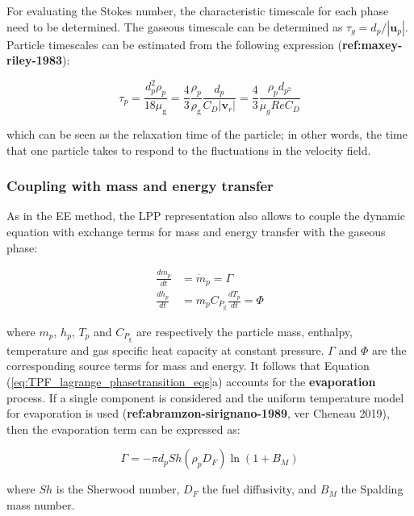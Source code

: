 For evaluating the Stokes number, the characteristic timescale for each phase need to be determined. The gaseous timescale can be determined as $\tau_g = d_p / | \textbf{u}_p |$. Particle timescales can be estimated from the following expression (\textbf{ref:maxey-riley-1983}):

\begin{equation}
\tau_p = \frac{d_p^2 \rho_p}{18 \mu_\mathrm{g}} =  \frac{4}{3} \frac{\rho_p}{\rho_\mathrm{g}} \frac{d_p}{C_D | \boldsymbol{v}_r |} = \frac{4}{3} \frac{\rho_p d_{p^2}}{\mu_g Re C_D}
\end{equation}

which can be seen as the relaxation time of the particle; in other words, the time that one particle takes to respond to the fluctuations in the velocity field.


\subsubsection*{Coupling with mass and energy transfer}

As in the EE method, the LPP representation also allows to couple the dynamic equation with exchange terms for mass and energy transfer with the gaseous phase:

\begin{subequations}
\label{eq:TPF_lagrange_phasetransition_eqs}
\begin{align}
\frac{d m_p}{d t} &= \dot{m}_p = \Gamma \\
\frac{d h_p}{d t} &= m_p C_{P_\mathrm{g}} \frac{d T_p}{d t} = \Phi
\end{align}
\end{subequations}

where $m_p$, $h_p$, $T_p$ and $C_{P_\mathrm{g}}$ are respectively the particle mass, enthalpy, temperature and gas specific heat capacity at constant pressure. $\Gamma$ and $\Phi$ are the corresponding source terms for mass and energy. It follows that Equation (\ref{eq:TPF_lagrange_phasetransition_eqs}a) accounts for the \textbf{evaporation} process. If a single component is considered and the uniform temperature model for evaporation is used (\textbf{ref:abramzon-sirignano-1989}, ver Cheneau 2019), then the evaporation term can be expressed as:

\begin{equation}
\Gamma = - \pi d_p Sh \left( \rho_p D_F \right) \ln \left( 1 + B_M \right)
\end{equation}

where $Sh$ is the Sherwood number, $D_F$ the fuel diffusivity, and $B_M$ the Spalding mass number. \\

